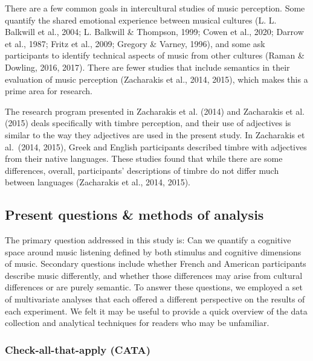 \documentclass[
  english,
  man,floatsintext]{apa6}
\begin{document}
There are a few common goals in intercultural studies of music perception. Some quantify the shared emotional experience between musical cultures (L. L. Balkwill et al., 2004; L. Balkwill \& Thompson, 1999; Cowen et al., 2020; Darrow et al., 1987; Fritz et al., 2009; Gregory \& Varney, 1996), and some ask participants to identify technical aspects of music from other cultures (Raman \& Dowling, 2016, 2017). There are fewer studies that include semantics in their evaluation of music perception (Zacharakis et al., 2014, 2015), which makes this a prime area for research.

The research program presented in Zacharakis et al. (2014) and Zacharakis et al. (2015) deals specifically with timbre perception, and their use of adjectives is similar to the way they adjectives are used in the present study. In Zacharakis et al.~(2014, 2015), Greek and English participants described timbre with adjectives from their native languages. These studies found that while there are some differences, overall, participants' descriptions of timbre do not differ much between languages (Zacharakis et al., 2014, 2015).

\hypertarget{present-questions-methods-of-analysis}{%
\subsection{Present questions \& methods of analysis}\label{present-questions-methods-of-analysis}}

The primary question addressed in this study is: Can we quantify a cognitive space around music listening defined by both stimulus and cognitive dimensions of music. Secondary questions include whether French and American participants describe music differently, and whether those differences may arise from cultural differences or are purely semantic. To answer these questions, we employed a set of multivariate analyses that each offered a different perspective on the results of each experiment. We felt it may be useful to provide a quick overview of the data collection and analytical techniques for readers who may be unfamiliar.

\hypertarget{check-all-that-apply-cata}{%
\subsubsection{Check-all-that-apply (CATA)}\label{check-all-that-apply-cata}}
\end{document}
